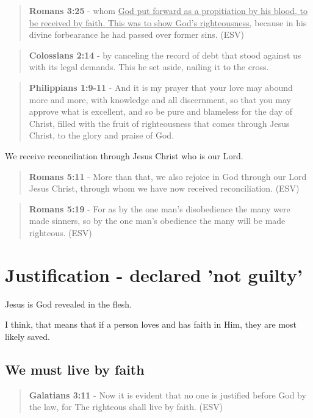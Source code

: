 \documentclass[11pt]{article}
\begin{document}
\begin{quote}
\textbf{Romans 3:25} -  whom \uline{God put forward as a propitiation by his blood, to be received by faith.  This was to show God's righteousness,} because in his divine forbearance he had passed over former sins.  (ESV)
\end{quote}

\begin{quote}
\textbf{Colossians 2:14} - by canceling the record of debt that stood against us with its legal demands. This he set aside, nailing it to the cross.
\end{quote}

\begin{quote}
\textbf{Philippians 1:9-11} - And it is my prayer that your love may abound more and more, with knowledge and all discernment, so that you may approve what is excellent, and so be pure and blameless for the day of Christ, filled with the fruit of righteousness that comes through Jesus Christ, to the glory and praise of God.
\end{quote}

We receive reconciliation through Jesus Christ who is our Lord.

\begin{quote}
\textbf{Romans 5:11} - More than that, we also rejoice in God through our Lord Jesus Christ, through whom we have now received reconciliation. (ESV)
\end{quote}

\begin{quote}
\textbf{Romans 5:19} - For as by the one man's disobedience the many were made sinners, so by the one man's obedience the many will be made righteous. (ESV)
\end{quote}

\section{Justification - declared 'not guilty'}
\label{sec:org1b3461b}
Jesus is God revealed in the flesh.

I think, that means that if a person loves and has faith in Him, they are most likely saved.

\subsection{We must \textbf{live} by faith}
\label{sec:orgdebc38c}
\begin{quote}
\textbf{Galatians 3:11} - Now it is evident that no one is justified before God by the law, for The righteous shall live by faith. (ESV)
\end{quote}
\end{document}
